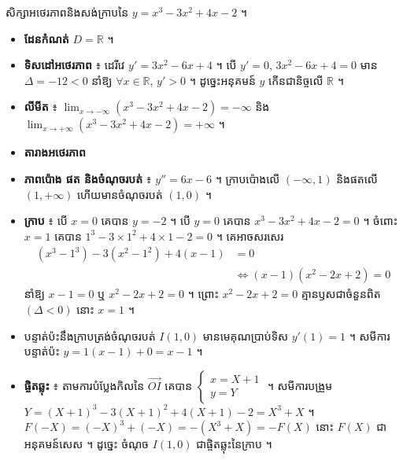 \begin{example}[ឧទាហរណ៍ ២]
សិក្សាអថេរភាពនិងសង់ក្រាបនៃ $y = x^3 - 3x^2 + 4x - 2$ ។
\end{example}
\begin{itemize}
  \item \textbf{ដែនកំណត់} $D = \mathbb{R}$ ។
  \item \textbf{ទិសដៅអថេរភាព} ៖ ដេរីវេ $y' = 3x^2 - 6x + 4$ ។ បើ $y' = 0$, $3x^2 - 6x + 4 = 0$ មាន $\Delta = -12 < 0$ នាំឱ្យ $\forall x \in \mathbb{R}$, $y' > 0$ ។ ដូច្នេះអនុគមន៍ $y$ កើនជានិច្ចលើ $\mathbb{R}$ ។
  \item \textbf{លីមីត} ៖ $\displaystyle\lim_{x \to -\infty}(x^3 - 3x^2 + 4x - 2) = -\infty$ និង $\displaystyle\lim_{x \to +\infty}(x^3 - 3x^2 + 4x - 2) = +\infty$ ។
  \item \textbf{តារាងអថេរភាព}
  \begin{center}
  \end{center}
  \item \textbf{ភាពប៉ោង ផត និងចំណុចរបត់} ៖ $y'' = 6x - 6$ ។ ក្រាបប៉ោងលើ $(-\infty, 1)$ និងផតលើ $(1, +\infty)$ ហើយមានចំណុចរបត់ $(1, 0)$ ។
  \item \textbf{ក្រាប} ៖ បើ $x = 0$ គេបាន $y = -2$ ។ បើ $y = 0$ គេបាន $x^3 - 3x^2 + 4x - 2 = 0$ ។ ចំពោះ $x = 1$ គេបាន $1^3 - 3\times 1^2 + 4\times 1 - 2 = 0$ ។ គេអាចសរសេរ
  \[
\begin{aligned}
(x^3 - 1^3) - 3(x^2 - 1^2) + 4(x - 1) &= 0\\
&\Leftrightarrow (x - 1)(x^2 - 2x + 2) = 0
\end{aligned}
\]
  នាំឱ្យ $x - 1 = 0$ ឬ $x^2 - 2x + 2 = 0$ ។ ព្រោះ $x^2 - 2x + 2 = 0$ គ្មានឫសជាចំនួនពិត $(\Delta < 0)$ នោះ $x = 1$ ។
  \item បន្ទាត់ប៉ះនឹងក្រាបត្រង់ចំណុចរបត់ $I(1, 0)$ មានមេគុណប្រាប់ទិស $y'(1) = 1$ ។ សមីការបន្ទាត់ប៉ះ $y = 1(x - 1) + 0 = x - 1$ ។
  \item \textbf{ផ្ចិតឆ្លុះ} ៖ តាមការបំប្លែងកិលនៃ $\overrightarrow{OI}$ គេបាន $\begin{cases} x = X + 1\\ y = Y \end{cases}$ ។ សមីការបង្រួម $Y = (X + 1)^3 - 3(X + 1)^2 + 4(X + 1) - 2 = X^3 + X$ ។ $F(-X) = (-X)^3 + (-X) = -(X^3 + X) = -F(X)$ នោះ $F(X)$ ជាអនុគមន៍សេស ។ ដូច្នេះ ចំណុច $I(1, 0)$ ជាផ្ចិតឆ្លុះនៃក្រាប ។
\end{itemize}

